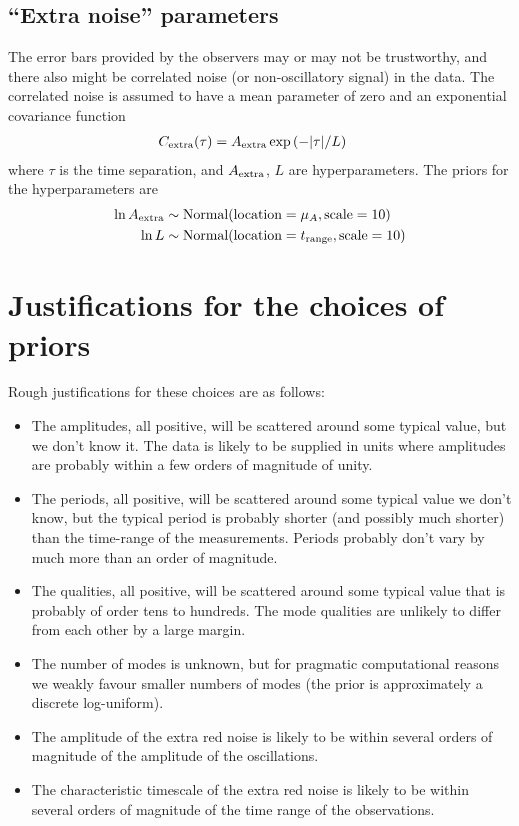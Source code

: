\documentclass[a4paper, 12pt]{article}
\newcommand{\location}{\textnormal{location}}
\newcommand{\Normal}{\textnormal{Normal}}
\newcommand{\scale}{\textnormal{scale}}
\begin{document}
\subsection{``Extra noise'' parameters}

The error bars provided by the observers may or may not be trustworthy, and
there also might be correlated noise (or non-oscillatory signal) in the data.
The correlated noise is assumed to have a mean parameter of zero
and an exponential covariance function
\begin{align}
C_{\rm extra}(\tau) &= A_{\rm extra}\exp\left(-|\tau| / L\right)
\end{align}
where $\tau$ is the time separation, and $A_{\rm extra}$, $L$ are
hyperparameters. The priors for the hyperparameters are
\begin{align}
\ln A_{\rm extra} &\sim \Normal(\location=\mu_A, \scale=10) \\
\ln L &\sim \Normal(\location=t_{\rm range}, \scale=10)
\end{align}

\section{Justifications for the choices of priors}

Rough justifications for these choices are as follows:
\begin{itemize}
    \item The amplitudes, all positive, will be scattered around some typical
          value, but we don't know it. The data is likely to be supplied
          in units where amplitudes are probably
          within a few orders of magnitude of unity.
    \item The periods, all positive, will be scattered around some typical
          value we don't know, but the typical period is probably shorter
          (and possibly much shorter) than the time-range of the measurements.
          Periods probably don't vary by much more than an order of magnitude.
    \item The qualities, all positive, will be scattered around some typical
          value that is probably of order tens to hundreds. The mode qualities
          are unlikely to differ from each other by a large margin.
    \item The number of modes is unknown, but for pragmatic computational
          reasons we weakly favour smaller numbers of modes (the prior
          is approximately a discrete log-uniform).
    \item The amplitude of the extra red noise is likely to be within
          several orders of magnitude of the amplitude of the oscillations.
    \item The characteristic timescale of the extra red noise is likely to
          be within several orders of magnitude of the time range of the
          observations.
\end{itemize}

\end{document}
